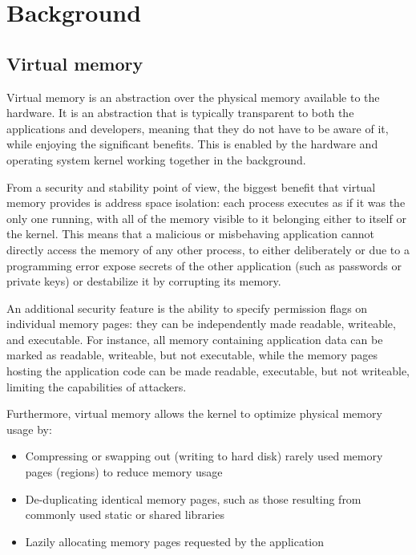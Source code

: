\chapter{Background}
\label{ch:background}


\section{Virtual memory}

Virtual memory is an abstraction over the physical memory available to the hardware. It is an abstraction that is typically transparent to both the applications and developers, meaning that they do not have to be aware of it, while enjoying the significant benefits. This is enabled by the hardware and operating system kernel working together in the background.

From a security and stability point of view, the biggest benefit that virtual memory provides is address space isolation: each process executes as if it was the only one running, with all of the memory visible to it belonging either to itself or the kernel. This means that a malicious or misbehaving application cannot directly access the memory of any other process, to either deliberately or due to a programming error expose secrets of the other application (such as passwords or private keys) or destabilize it by corrupting its memory.

An additional security feature is the ability to specify permission flags on individual memory pages: they can be independently made readable, writeable, and executable. For instance, all memory containing application data can be marked as readable, writeable, but not executable, while the memory pages hosting the application code can be made readable, executable, but not writeable, limiting the capabilities of attackers.

Furthermore, virtual memory allows the kernel to optimize physical memory usage by:

\begin{itemize}
	\item Compressing or swapping out (writing to hard disk) rarely used memory pages (regions) to reduce memory usage
	\item De-duplicating identical memory pages, such as those resulting from commonly used static or shared libraries
	\item Lazily allocating memory pages requested by the application
\end{itemize}

